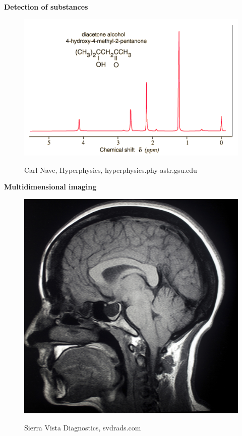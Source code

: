\documentclass[aspectratio=169]{beamer}
\begin{document}
\begin{frame}
	\begin{minipage}[t]{0.48 \textwidth}
		\centering
		\textbf{Detection of substances}
		\begin{figure}
			\includegraphics[height=0.3\textheight]{./Resources/cshift.png}
			\label{fig:cshift}
			\caption{\tiny{Carl Nave, Hyperphysics, hyperphysics.phy-astr.gsu.edu}}
		\end{figure}
	\end{minipage}
	\begin{minipage}[t]{0.48 \textwidth}
		\centering
		\textbf{Multidimensional imaging}
		\begin{figure}
			\includegraphics[height=0.3\textheight]{./Resources/mri_head.jpg}
			\label{fig:mri_head}
			\caption{\tiny{Sierra Vista Diagnostics, svdrads.com}}
		\end{figure}
	\end{minipage}
\end{frame}
\end{document}
